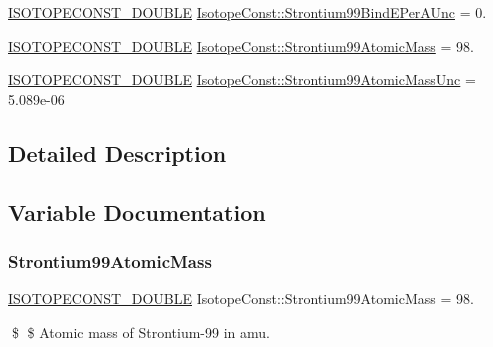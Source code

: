 \begin{DoxyCompactItemize}
\mbox{\hyperlink{group___isotope_const-_macros_ga8f45a7272ce02c0b4c65c44636ed719a}{I\+S\+O\+T\+O\+P\+E\+C\+O\+N\+S\+T\+\_\+\+D\+O\+U\+B\+LE}} \mbox{\hyperlink{group___isotope_const-_strontium-_sr99_gaf5f25464d37db41da7bcbe2ce62157e4}{Isotope\+Const\+::\+Strontium99\+Bind\+E\+Per\+A\+Unc}} = 0.
\item 
\mbox{\hyperlink{group___isotope_const-_macros_ga8f45a7272ce02c0b4c65c44636ed719a}{I\+S\+O\+T\+O\+P\+E\+C\+O\+N\+S\+T\+\_\+\+D\+O\+U\+B\+LE}} \mbox{\hyperlink{group___isotope_const-_strontium-_sr99_gad096d6d80f55ff6e5704e37e84549e07}{Isotope\+Const\+::\+Strontium99\+Atomic\+Mass}} = 98.
\item 
\mbox{\hyperlink{group___isotope_const-_macros_ga8f45a7272ce02c0b4c65c44636ed719a}{I\+S\+O\+T\+O\+P\+E\+C\+O\+N\+S\+T\+\_\+\+D\+O\+U\+B\+LE}} \mbox{\hyperlink{group___isotope_const-_strontium-_sr99_ga6b660463fb3560092543e2f6a954d644}{Isotope\+Const\+::\+Strontium99\+Atomic\+Mass\+Unc}} = 5.\+089e-\/06
\end{DoxyCompactItemize}


\subsection{Detailed Description}


\subsection{Variable Documentation}
\mbox{\label{group___isotope_const-_strontium-_sr99_gad096d6d80f55ff6e5704e37e84549e07}} 
\subsubsection{\texorpdfstring{Strontium99\+Atomic\+Mass}{Strontium99AtomicMass}}
{\footnotesize\ttfamily \mbox{\hyperlink{group___isotope_const-_macros_ga8f45a7272ce02c0b4c65c44636ed719a}{I\+S\+O\+T\+O\+P\+E\+C\+O\+N\+S\+T\+\_\+\+D\+O\+U\+B\+LE}} Isotope\+Const\+::\+Strontium99\+Atomic\+Mass = 98.}

\$ \$ Atomic mass of Strontium-\/99 in amu. \mbox{\label{group___isotope_const-_strontium-_sr99_ga6b660463fb3560092543e2f6a954d644}} 

